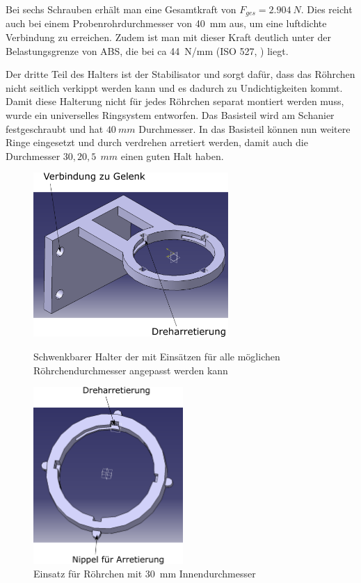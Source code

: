 Bei sechs Schrauben erhält man eine Gesamtkraft von $F_{ges} = \SI{2,904}{N}$. Dies reicht auch bei einem Probenrohrdurchmesser von \SI{40}{mm} aus, um eine luftdichte Verbindung zu erreichen. Zudem ist man mit dieser Kraft deutlich unter der Belastungsgrenze von ABS, die bei ca \SI{44}{N/mm} (ISO 527, \cite{C.Dallner2006, ThyssenPlastics}) liegt.

Der dritte Teil des Halters ist der Stabilisator und sorgt dafür, dass das Röhrchen nicht seitlich verkippt werden kann und es dadurch zu Undichtigkeiten kommt. Damit diese Halterung nicht für jedes Röhrchen separat montiert werden muss, wurde ein universelles Ringsystem entworfen. Das Basisteil wird am Schanier festgeschraubt und hat $\SI{40}{mm}$ Durchmesser. In das Basisteil können nun weitere Ringe eingesetzt und durch verdrehen arretiert werden, damit auch die Durchmesser $30,20,5\SI{}{\ mm}$ einen guten Halt haben.

	\begin{figure}[h!]
		\begin{minipage}[hbt]{7.4cm}
			\centering
			\includegraphics[width=7.4cm]{Basishalter.png}
			\caption[Röhrchenhalter oben]{Schwenkbarer Halter der mit Einsätzen für alle möglichen Röhrchendurchmesser angepasst werden kann}
		\end{minipage}
		\hfill
		\begin{minipage}[hbt]{5.7cm}
			\centering
			\includegraphics[width=5.7cm]{Basishalter_Einsatz.png}
			\caption[Röhrchenhalter Einsatz oben]{Einsatz für Röhrchen mit \SI{30}{mm} Innendurchmesser}
		\end{minipage}
	\end{figure}
	
